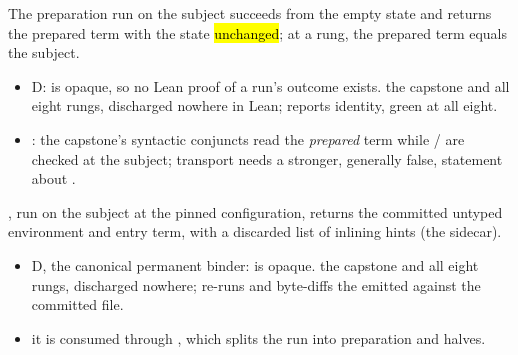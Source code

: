 \begin{assumption}
\label{asm:hprep}
\stAssumed{}  The preparation run on the subject succeeds from the empty state and
returns the prepared term with the state \hl{unchanged}; at a rung, the prepared term equals the
subject.
\begin{itemize}
\item {} D:  is opaque, so no Lean proof of a run's outcome exists.
 the capstone and all eight rungs, discharged nowhere in Lean;  reports identity, green at all eight.
\item {}: the capstone's syntactic conjuncts read the \emph{prepared} term while
/ are checked at the subject; transport needs a stronger, generally
false, statement about .
\end{itemize}
\end{assumption}

\begin{assumption}
\label{asm:hrun}
\stAssumed{}  , run on the subject at the pinned configuration,
returns the committed untyped environment and entry term, with a discarded list of inlining hints
(the  sidecar).
\begin{itemize}
\item {} D, the canonical permanent binder:  is opaque.  the capstone and all eight rungs, discharged nowhere;  re-runs
 and byte-diffs the emitted  against the committed file.
\item {} it is consumed through , which splits the run into
preparation and  halves.
\end{itemize}
\end{assumption}

